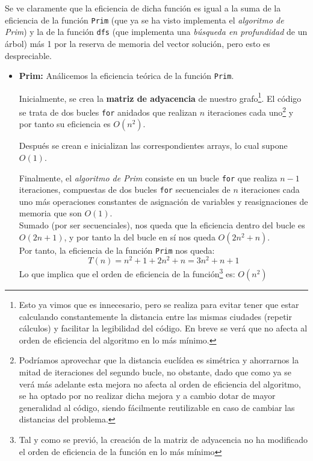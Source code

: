 \documentclass{article}
\begin{document}
Se ve claramente que la eficiencia de dicha función es igual a la suma de la eficiencia de la función \verb|Prim| (que ya se ha visto implementa el \textit{algoritmo de Prim}) y la de la función \verb|dfs| (que implementa una \textit{búsqueda en profundidad} de un árbol) más 1 por la reserva de memoria del vector solución, pero esto es despreciable.
\begin{itemize}
    \item \textbf{Prim:}
    Análicemos la eficiencia teórica de la función \verb|Prim|.
    
    Inicialmente, se crea la \textbf{matriz de adyacencia} de nuestro grafo\footnote{Esto ya vimos que es innecesario, pero se realiza para evitar tener que estar calculando constantemente la distancia entre las mismas ciudades (repetir cálculos) y facilitar la legibilidad del código. 
    En breve se verá que no afecta al orden de eficiencia del algoritmo en lo más mínimo.}.
    El código se trata de dos bucles \verb|for| anidados que realizan $n$ iteraciones cada uno\footnote{Podríamos aprovechar que la distancia euclídea es simétrica y ahorrarnos la mitad de iteraciones del segundo bucle, no obstante, dado que como ya se verá más adelante esta mejora no afecta al orden de eficiencia del algoritmo, se ha optado por no realizar dicha mejora y a cambio dotar de mayor generalidad al código, siendo fácilmente reutilizable en caso de cambiar las distancias del problema.} y por tanto su eficiencia es $O(n^{2})$.
    
    
    
    Después se crean e inicializan las correspondientes arrays, lo cual supone $O(1)$.
    
    Finalmente, el \textit{algoritmo de Prim} consiste en un bucle \verb|for| que realiza $n-1$ iteraciones, compuestas de dos bucles \verb|for| secuenciales de $n$ iteraciones cada uno más operaciones constantes de asignación de variables y reasignaciones de memoria que son $O(1)$.\\
    Sumado (por ser secuenciales), nos queda que la eficiencia dentro del bucle es $O(2n + 1)$, y por tanto la del bucle en sí nos queda $O(2n^{2} + n)$.\\
    Por tanto, la eficiencia de la función \verb|Prim| nos queda:
    $$
    T(n) = n^{2} + 1 + 2n^{2} + n = 3n^{2} + n + 1
    $$
    Lo que implica que el orden de eficiencia de la función\footnote{Tal y como se previó, la creación de la matriz de adyacencia no ha modificado el orden de eficiencia de la función en lo más mínimo} es: $O(n^{2})$

\end{itemize}
\end{document}
